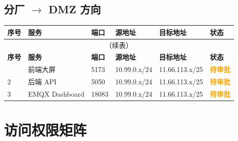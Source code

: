 \documentclass[12pt,a4paper]{ctexart}
\newcommand{\statusapprove}{\textcolor{orange}{\textbf{待审批}}}
\begin{document}
\subsection{分厂 $\rightarrow$ DMZ 方向}

\begin{longtable}{p{0.7cm} p{2.5cm} p{0.8cm} p{2.5cm} p{2.5cm} p{1.5cm}}
\toprule
\textbf{序号} & \textbf{服务} & \textbf{端口} & \textbf{源地址} & \textbf{目标地址} & \textbf{状态} \\
\midrule
\endfirsthead
\multicolumn{6}{c}{\small（续表）} \\
\toprule
\textbf{序号} & \textbf{服务} & \textbf{端口} & \textbf{源地址} & \textbf{目标地址} & \textbf{状态} \\
\midrule
\endhead
\bottomrule
\endfoot
1 & 前端大屏 & 5173 & 10.99.0.x/24 & 11.66.113.x/25 & \statusapprove \\
2 & 后端 API & 5050 & 10.99.0.x/24 & 11.66.113.x/25 & \statusapprove \\
3 & EMQX Dashboard & 18083 & 10.99.0.x/24 & 11.66.113.x/25 & \statusapprove \\
\end{longtable}

\section{访问权限矩阵}
\end{document}
